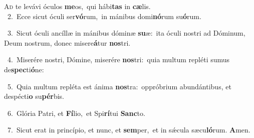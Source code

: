 \lettrine{\initial\textcolor{\initialcolor}{A}}{d} te levávi óculos \textbf{me}\-os,~\star qui hábi\textbf{tas} in \textbf{cæ}\-lis.\\
{\numbfont\textcolor{\numbcolor}{~2.}}~Ecce sicut óculi ser\-\textbf{vó}\-rum,~\star in mánibus domi\-\textbf{nó}\-rum su\-\textbf{ó}\-rum.\par
{\numbfont\textcolor{\numbcolor}{~3.}}~Sicut óculi ancíllæ in mánibus dóminæ \textbf{su}\-æ:~\star ita óculi nostri ad Dóminum, Deum nostrum, donec misere\-\textbf{á}\-tur \textbf{nos}\-tri.\par
{\numbfont\textcolor{\numbcolor}{~4.}}~Miserére nostri, Dómine, miserére \textbf{nos}\-tri:~\star quia multum repléti sumus de\-\textbf{spec}\-ti\-\textbf{ó}\-ne:\par
{\numbfont\textcolor{\numbcolor}{~5.}}~Quia multum repléta est ánima \textbf{nos}\-tra:~\star oppróbrium abundántibus, et despécti\textbf{o} su\-\textbf{pér}\-bis.\par
{\numbfont\textcolor{\numbcolor}{~6.}}~Glória Patri, et \textbf{Fí}\-lio,~\star et Spi\-\textbf{rí}\-tui \textbf{Sanc}\-to.\par
{\numbfont\textcolor{\numbcolor}{~7.}}~Sicut erat in princípio, et nunc, et \textbf{sem}\-per,~\star et in sǽcula sæcu\-\textbf{ló}\-rum. \textbf{A}\-men.\par
